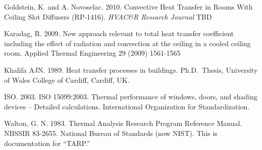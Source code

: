 Goldstein, K. and A. Novoselac. 2010. Convective Heat Transfer in Rooms With Ceiling Slot Diffusers (RP-1416). \emph{HVAC\&R Research Journal} TBD

Karadag, R. 2009. New approach relevant to total heat transfer coefficient including the effect of radiation and convection at the ceiling in a cooled ceiling room. Applied Thermal Engineering 29 (2009) 1561-1565

Khalifa AJN. 1989. Heat transfer processes in buildings. Ph.D.~Thesis, University of Wales College of Cardiff, Cardiff, UK.

ISO. 2003. ISO 15099:2003. Thermal performance of windows, doors, and shading devices -- Detailed calculations. International Organization for Standardization.

Walton, G. N. 1983. Thermal Analysis Research Program Reference Manual. NBSSIR 83-2655. National Bureau of Standards (now NIST). This is documentation for ``TARP.''
